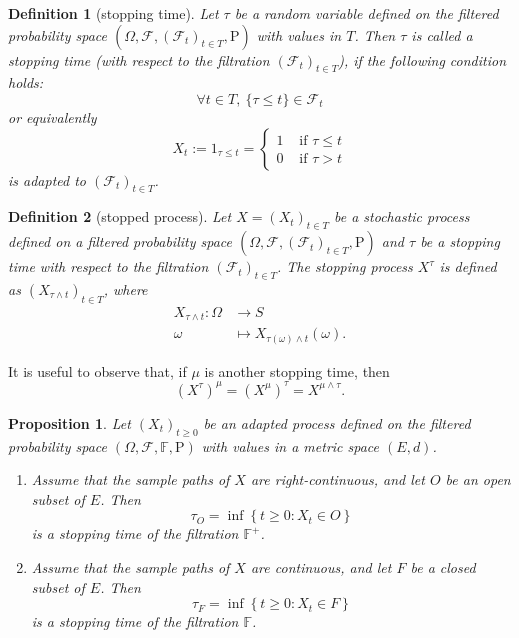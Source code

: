 \documentclass{article}
\newtheorem{definition}{Definition}[section]
\newtheorem{proposition}{Proposition}[section]
\theoremstyle{nonumberplain}
\begin{document}
\begin{definition}[stopping time]
Let $\tau$  be a random variable defined on the filtered probability space $(\Omega,\mathcal{F},(\mathcal{F}_{t})_{t\in T },\mathrm{P})$ with values in $T$. Then $\tau$  is called a \emph{stopping time} (with respect to the filtration $(\mathcal{F}_{t})_{t\in T}$), if the following condition holds:
\[
\forall t\in T,\ \{\tau \leq t\}\in {\mathcal {F}}_{t}
\]
or equivalently
\[
X_{t} :=1_{\tau\le t}=\left\{\begin{array}{ll}{1} & {\text { if }  \tau\le t } \\ {0} & {\text { if }\tau >t}\end{array}\right.
\]
is adapted to $(\mathcal{F}_{t})_{t\in T }$.
\end{definition}

\begin{definition}[stopped process]
	Let $X=(X_{t})_{t\in T}$ be a stochastic process defined on a filtered probability space $(\Omega,\mathcal{F},(\mathcal{F}_{t})_{t\in T},\mathrm{P})$ and $\tau$ be a stopping time with respect to the filtration $(\mathcal{F}_{t})_{t\in T}$. The stopping process $X^\tau$ is defined as $(X_{\tau \wedge t})_{t\in T}$, where
	\begin{align*}
	X_{\tau \wedge t}:\Omega&\longrightarrow S\\
	\omega&\longmapsto X_{\tau(\omega) \wedge t}(\omega).
	\end{align*}
\end{definition}
It is useful to observe that, if $\mu$ is another stopping time, then
\[
(X^\tau)^\mu=(X^\mu)^\tau=X^{\mu\wedge\tau}.
\]
\begin{proposition}
	Let $\left(X_{t}\right)_{t \geq 0}$ be an adapted process defined on the filtered probability space $(\Omega,\mathcal{F},\mathbb{F},\mathrm{P})$ with values in a metric space $(E, d)$.
	\begin{enumerate}  
		\item Assume that the sample paths of $X$ are right-continuous, and let $O$ be an open subset of $E$. Then
		\[
		\tau_{O}=\inf \left\{t \geq 0: X_{t} \in O\right\}
		\]
		is a stopping time of the filtration $\mathbb{F}^+$.
		\item Assume that the sample paths of $X$ are continuous, and let $F$ be a closed subset
		of $E$. Then
		\[
		\tau_{F}=\inf \left\{t \geq 0: X_{t} \in F\right\}
		\]
		is a stopping time of the filtration $\mathbb{F}$.
	\end{enumerate}
\end{proposition}
\end{document}
